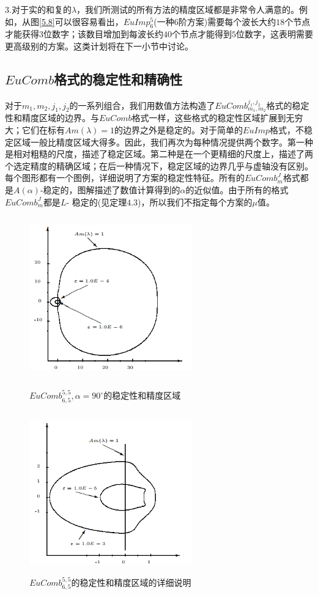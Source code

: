 \documentclass[12pt,a4paper]{article}
\begin{document}
$3$.对于实的和复的$\lambda$，我们所测试的所有方法的精度区域都是非常令人满意的。例如，从图\ref{5.8}可以很容易看出，$EuImp^5_6$(一种$6$阶方案)需要每个波长大约$18$个节点才能获得$3$位数字；该数目增加到每波长约$40$个节点才能得到$5$位数字，这表明需要更高级别的方案。这类计划将在下一小节中讨论。\\
\subsection{$EuComb$格式的稳定性和精确性}

对于$m_1,m_2,j_1,j_2$的一系列组合，我们用数值方法构造了$EuComb_{m_1,m_2}^{j_1,j_2}$格式的稳定性和精度区域的边界。与$EuComb$格式一样，这些格式的稳定性区域扩展到无穷大；它们在标有$Am(\lambda)=1$的边界之外是稳定的。对于简单的$EuImp$格式，不稳定区域一般比精度区域大得多。因此，我们再次为每种情况提供两个数字。第一种是相对粗糙的尺度，描述了稳定区域。第二种是在一个更精细的尺度上，描述了两个选定精度的精确区域；在后一种情况下，稳定区域的边界几乎与虚轴没有区别。每个图形都有一个图例，详细说明了方案的稳定性特征。所有的$EuComb^J_m$格式都是$A(\alpha)$-稳定的，图解描述了数值计算得到的$\alpha$的近似值。由于所有的格式$EuComb^J_m$都是$L$- 稳定的(见定理$4.3$)，所以我们不指定每个方案的$\mu$值。\\
\begin{figure}[H]
	{
		\begin{minipage}{6cm}
			\centering
			\includegraphics[width=7cm,height=7cm]{./figures/13.png}
			\caption{$EuComb_{6,5}^{5,5},\alpha = 90^{\circ}$的稳定性和精度区域}
			\label{5.13}
		\end{minipage}
	}
	{
		\begin{minipage}{6cm}
			\centering
			\includegraphics[width=7cm,height=7cm]{./figures/14.png}
			\caption{$EuComb_{6,5}^{5,5}$的稳定性和精度区域的详细说明}
			\label{5.14}
		\end{minipage}
	}
\end{figure}
\end{document}
